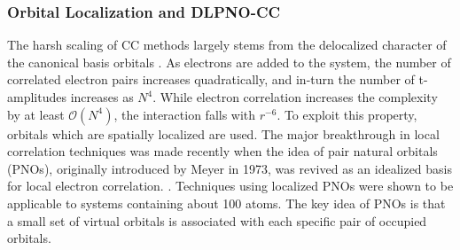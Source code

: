 \documentclass[letterpaper, 12pt]{article}
\begin{document}
\subsubsection{Orbital Localization and DLPNO-CC}
The harsh scaling of CC methods largely stems from the delocalized character of the canonical basis orbitals \cite{DLPNOCC,MP2}. As electrons are added to the system, the number of correlated electron pairs increases quadratically, and in-turn the number of t-amplitudes increases as $N^4$. While electron correlation increases the complexity by at least $\mathcal{O}(N^4)$, the interaction falls with $r^{-6}$. To exploit this property, orbitals which are spatially localized are used. The major breakthrough in local correlation techniques was made recently when the idea of pair natural orbitals (PNOs), originally introduced by Meyer in 1973, was revived as an idealized basis for local electron correlation. \cite{MEYER, LPNOCC}. Techniques using localized PNOs were shown to be applicable to systems containing about 100 atoms. The key idea of PNOs is that a small set of virtual orbitals is associated with each specific pair of occupied orbitals.\\
\end{document}
